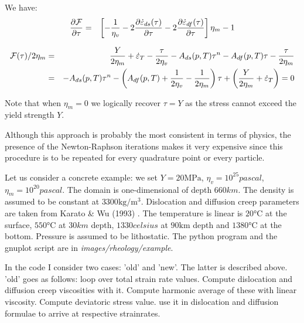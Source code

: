 \begin{itemize}
\begin{enumerate}
We have:
\begin{eqnarray}
\frac{\partial {\cal F}}{\partial \tau} &=&
\left[
- \frac{1}{\eta_v} 
-2 \frac{\partial  \dot\varepsilon_{ds}(\tau) }{\partial \tau} 
-2 \frac{\partial  \dot\varepsilon_{df}(\tau) }{\partial \tau} 
\right] \eta_m - 1
\end{eqnarray}

\begin{eqnarray}
{\cal F}(\tau) / 2\eta_m 
&=& 
\frac{Y}{2\eta_m}  + \dot\varepsilon_T 
- \frac{\tau}{2\eta_v}
- A_{ds}(p,T) \tau^n 
- A_{df}(p,T) \tau  
- \frac{\tau}{2\eta_m} \\
&=& 
- A_{ds}(p,T) \tau^n - \left(A_{df}(p,T) +  \frac{1}{2\eta_v} -\frac{1}{2\eta_m} \right) \tau
+ 
\left( \frac{Y}{2\eta_m}  + \dot\varepsilon_T \right) =0
\end{eqnarray}



\end{enumerate}

Note that when $\eta_m=0$ we logically recover $\tau=Y$ as the stress cannot exceed the yield strength $Y$.

Although this approach is probably the most consistent in terms of physics, the presence 
of the Newton-Raphson iterations makes it very expensive since this procedure is to be repeated 
for every quadrature point or every particle.

Let us consider a concrete example: we set $Y=20\si{\mega\pascal}$, $\eta_v=10^{25}\si{pascal}$, 
$\eta_m=10^{20}\si{pascal}$. The domain is one-dimensional of depth $660\si{km}$. The density is
assumed to be constant at $3300\si{\kg\per\cubic\metre}$. Dislocation and diffusion creep parameters
are taken from Karato \& Wu (1993) \cite{kawu93}. The temperature is linear is $20\si{\celsius}$ 
at the surface, $550\si{\celsius}$ at $30\si{km}$ depth, $1330\si{celsius}$ at $90\si{\km}$ depth 
and $1380\si{\celsius}$ at the bottom. Pressure is assumed to be lithostatic. 
The python program and the gnuplot script are in {\sl images/rheology/example}.

In the code I consider two cases: 'old' and 'new'. The latter is described above. 
'old' goes as follows: loop over total strain rate values. 
Compute dislocation and diffusion creep viscosities with it. Compute harmonic 
average of these with linear viscosity. Compute deviatoric stress value. 
use it in dislocation and diffusion formulae to arrive at respective strainrates. 


\end{itemize}
